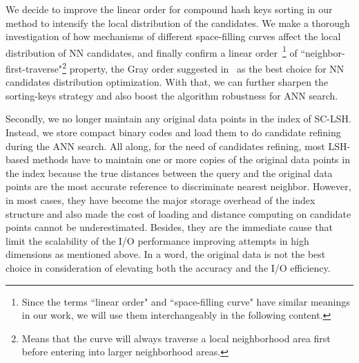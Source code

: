 \documentclass[twocolumn]{svjour3}          %
\begin{document}
We decide to improve the linear order for compound hash keys sorting in our method to intensify the local distribution of the candidates. We make a thorough investigation of how mechanisms of different space-filling curves affect the local distribution of NN candidates, and finally confirm a linear order~\footnote{Since the terms ``linear order" and ``space-filling curve" have similar meanings in our work, we will use them interchangeably in the following content.} of ``neighbor-first-traverse"\footnote{Means that the curve will always traverse a local neighborhood area first before entering into larger neighborhood areas.} property, the Gray order suggested in~\cite{Faloutsos1986Gray} as the best choice for NN candidates distribution optimization.
With that, we can further sharpen the sorting-keys strategy and also boost the algorithm robustness for ANN search.

Secondly, we no longer maintain any original data points in the index of SC-LSH. Instead, we store compact binary codes and load them to do candidate refining during the ANN search.
All along, for the need of candidates refining, most LSH-based methods have to maintain one or more copies of the original data points in the index because the true distances between the query and the original data points are the most accurate reference to discriminate nearest neighbor. However, in most cases, they have become the major storage overhead of the index structure and also made the cost of loading and distance computing on candidate points cannot be underestimated. Besides, they are the immediate cause that limit the scalability of the I/O performance improving attempts in high dimensions as mentioned above. In a word, the original data is not the best choice in consideration of elevating both the accuracy and the I/O efficiency.
\end{document}
